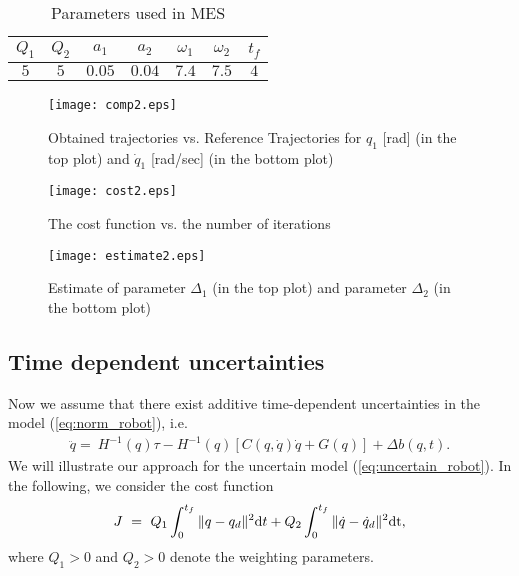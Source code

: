 \documentclass[twoside,leqno,onecolumn]{article}
\begin{document}
\begin{table}
\caption{Parameters used in MES} \label{tab:case2} \centering
\begin{tabular}{ |c|c|c|c|c|c|c| }
 \hline
$Q_1$ & $Q_2$ & $a_1$ & $a_2$& $\omega_1$ &$\omega_2$& $t_f$ \\ [0.5ex]
\hline
$5$ & $5$ & $0.05$ & $0.04$ & $7.4$ & $7.5$ & $4$  \\
 \hline
\end{tabular}
\end{table}
\begin{figure}
\vspace{-0cm}
\begin{center}
 \texttt{[image: comp2.eps]}
 \vspace{-0cm}
 \caption{Obtained trajectories vs. Reference Trajectories for $q_1$ [rad] (in the top plot) and $\dot{q}_1$ [rad/sec] (in the bottom plot)}
 \end{center}
 \label{fig:comp_case2}
\end{figure}
\begin{figure}
 \centering
 \vspace{-0cm}
 \hspace{-0cm}\texttt{[image: cost2.eps]}
 \vspace{-0cm}
 \caption{The cost function vs. the number of iterations}
 \label{fig:cost_case2}
\end{figure}
\begin{figure}
 \centering
 \vspace{-0cm}
 \texttt{[image: estimate2.eps]}
 \vspace{-0cm}
 \caption{Estimate of parameter $\Delta_1$ (in the top plot) and parameter $\Delta_2$ (in the bottom plot)}
 \label{fig:estimate_case2}
\end{figure}
\subsection{Time dependent uncertainties}
Now we assume that there exist additive time-dependent
uncertainties in the model (\ref{eq:norm_robot}), i.e.
\begin{align}
\label{eq:uncertain_robot} \ddot{q}=~H^{-1}(q) \tau -  H^{-1}(q)
\left[C(q,\dot{q})\dot{q}+ G(q)\right] + \Delta b(q,t).
\end{align}
We will illustrate our approach for the uncertain model
(\ref{eq:uncertain_robot}). In the following, we consider the cost
function
\begin{align}
\label{eq:cost} J~=~Q_1\int_{0}^{t_f} \|q-q_d\|^2 {\rm{d}} t
+Q_2\int_{0}^{t_f} \|\dot q-\dot {q}_d\|^2 \rm{d}t,
\end{align}
where $Q_1>0$ and $Q_2>0$ denote the weighting parameters.
\end{document}
